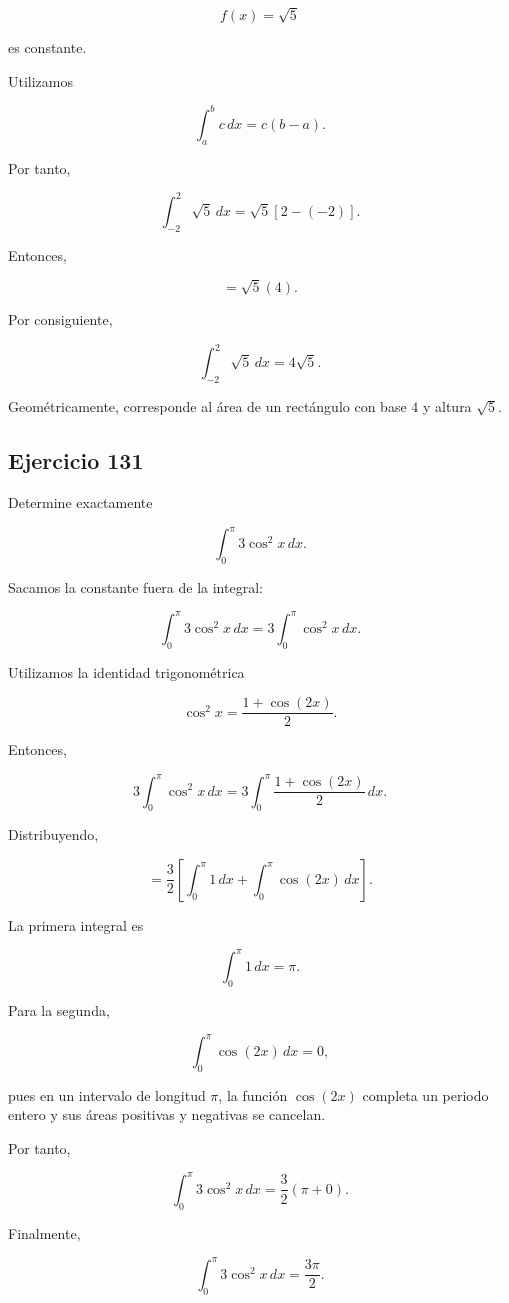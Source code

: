 \documentclass[12pt]{article}
\begin{document}
\[
f(x)=\sqrt5
\]

es constante.

Utilizamos

\[
\int_a^b c\,dx
=
c(b-a).
\]

Por tanto,

\[
\int_{-2}^{2}\sqrt5\,dx
=
\sqrt5\left[2-(-2)\right].
\]

Entonces,

\[
=
\sqrt5(4).
\]

Por consiguiente,

\[
\boxed{
\int_{-2}^{2}\sqrt5\,dx
=
4\sqrt5
}.
\]

Geométricamente, corresponde al área de un rectángulo con base \(4\)
y altura \(\sqrt5\).

\subsection*{Ejercicio 131}

Determine exactamente

\[
\int_0^\pi 3\cos^2x\,dx.
\]

Sacamos la constante fuera de la integral:

\[
\int_0^\pi3\cos^2x\,dx
=
3\int_0^\pi\cos^2x\,dx.
\]

Utilizamos la identidad trigonométrica

\[
\cos^2x
=
\frac{1+\cos(2x)}{2}.
\]

Entonces,

\[
3\int_0^\pi\cos^2x\,dx
=
3\int_0^\pi
\frac{1+\cos(2x)}{2}\,dx.
\]

Distribuyendo,

\[
=
\frac32
\left[
\int_0^\pi1\,dx
+
\int_0^\pi\cos(2x)\,dx
\right].
\]

La primera integral es

\[
\int_0^\pi1\,dx=\pi.
\]

Para la segunda,

\[
\int_0^\pi\cos(2x)\,dx=0,
\]

pues en un intervalo de longitud \(\pi\), la función \(\cos(2x)\)
completa un periodo entero y sus áreas positivas y negativas se
cancelan.

Por tanto,

\[
\int_0^\pi3\cos^2x\,dx
=
\frac32(\pi+0).
\]

Finalmente,

\[
\boxed{
\int_0^\pi3\cos^2x\,dx
=
\frac{3\pi}{2}
}.
\]
\end{document}
